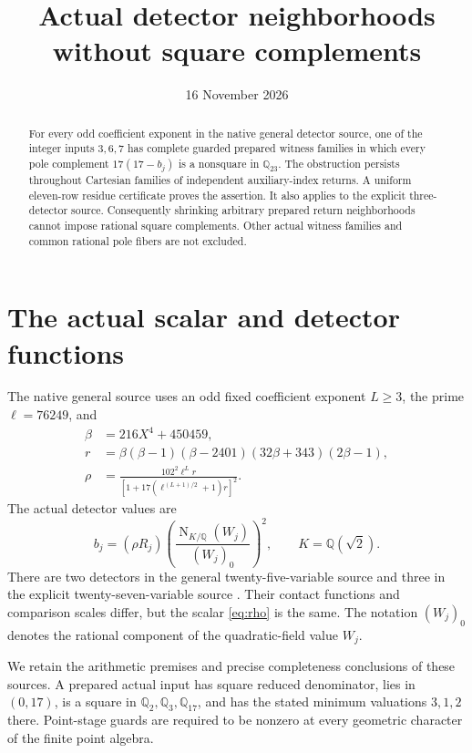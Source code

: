 \documentclass[11pt,a4paper]{article}
\title{Actual detector neighborhoods without square complements}
\author{}\date{16 November 2026}
\newcommand{\Q}{\mathbb Q}\newcommand{\Z}{\mathbb Z}
\DeclareMathOperator{\N}{N}
\begin{document}
\maketitle
\begin{abstract}
For every odd coefficient exponent in the native general detector source,
one of the integer inputs $3,6,7$ has complete guarded prepared witness
families in which every pole complement $17(17-b_j)$ is a nonsquare in
$\Q_{23}$. The obstruction persists throughout Cartesian families of
independent auxiliary-index returns. A uniform eleven-row residue
certificate proves the assertion. It also applies to the explicit
three-detector source. Consequently shrinking arbitrary prepared return
neighborhoods cannot impose rational square complements. Other actual
witness families and common rational pole fibers are not excluded.
\end{abstract}

\section{The actual scalar and detector functions}

The native general source \cite{General,UnitNorm} uses an odd fixed
coefficient exponent $L\ge3$, the prime $\ell=76249$, and
\begin{align}
 \beta&=216X^4+450459,\label{eq:beta}\\
 r&=\beta(\beta-1)(\beta-2401)(32\beta+343)(2\beta-1),\label{eq:r}\\
 \rho&=\frac{102^2\ell^Lr}
       {[1+17(\ell^{(L+1)/2}+1)r]^2}.\label{eq:rho}
\end{align}
The actual detector values are
\begin{equation}\label{eq:detector}
 b_j=(\rho R_j)
       \left(\frac{\N_{K/\Q}(W_j)}{(W_j)_0}\right)^2,
 \qquad K=\Q(\sqrt2).
\end{equation}
There are two detectors in the general twenty-five-variable source and
three in the explicit twenty-seven-variable source \cite{Explicit}.
Their contact functions and comparison scales differ, but the scalar
\eqref{eq:rho} is the same. The notation $(W_j)_0$ denotes the rational
component of the quadratic-field value $W_j$.

We retain the arithmetic premises and precise completeness conclusions
of these sources. A prepared actual input has square reduced denominator,
lies in $(0,17)$, is a square in $\Q_2,\Q_3,\Q_{17}$, and has the
stated minimum valuations $3,1,2$ there. Point-stage guards are required
to be nonzero at every geometric character of the finite point algebra.
\end{document}
